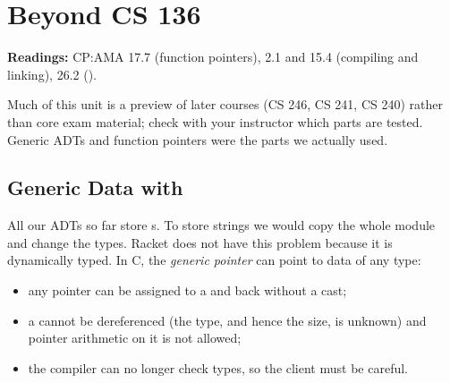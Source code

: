 \chapter{Beyond CS 136}

\textbf{Readings:} CP:AMA 17.7 (function pointers), 2.1 and 15.4 (compiling and linking),
26.2 ().

\begin{aside}
Much of this unit is a preview of later courses (CS 246, CS 241, CS 240) rather than core exam
material; check with your instructor which parts are tested. Generic  ADTs and
function pointers were the parts we actually used.
\end{aside}

\section{Generic Data with }

All our ADTs so far store s. To store strings we would copy the whole module and change
the types. Racket does not have this problem because it is dynamically typed. In C, the
\emph{generic pointer}  can point to data of any type:
\begin{itemize}
  \item any pointer can be assigned to a  and back without a cast;
  \item a  cannot be dereferenced (the type, and hence the size, is unknown) and
    pointer arithmetic on it is not allowed;
  \item the compiler can no longer check types, so the client must be careful.
\end{itemize}

